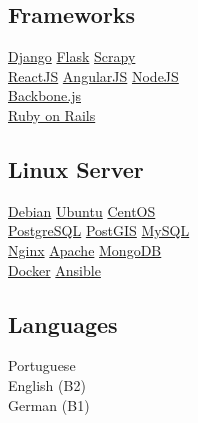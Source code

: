 \documentclass[]{joaosoares-resume}
\begin{document}
\begin{minipage}[t]{0.39\textwidth}
\subsection{Frameworks}
\href{https://www.djangoproject.com/}{Django} \textbullet{}
\href{http://flask.pocoo.org/}{Flask} \textbullet{}
\href{https://scrapy.org/}{Scrapy} \\
\href{https://reactjs.org/}{ReactJS} \textbullet{}
\href{https://angularjs.org}{AngularJS} \textbullet{}
\href{https://nodejs.org/en/}{NodeJS} \\
\href{https://backbonejs.org/}{Backbone.js} \\
\href{https://rubyonrails.org/}{Ruby on Rails} \\
\sectionsep

\subsection{Linux Server}
\href{http://www.debian.org/}{Debian}\textbullet{}
\href{http://www.ubuntu.com/}{Ubuntu}\textbullet{}
\href{http://www.centos.org/}{CentOS}\\
\href{http://www.postgresql.org/}{PostgreSQL}\textbullet{}
\href{http://www.postgis.net}{PostGIS}\textbullet{}
\href{https://www.mysql.com/}{MySQL}\\
\href{https://www.nginx.com/resources/wiki/}{Nginx}\textbullet{}
\href{http://httpd.apache.org/}{Apache} \textbullet{}
\href{https://www.mongodb.com/}{MongoDB} \\
\href{http://www.docker.com/}{Docker} \textbullet{}
\href{https://www.ansible.com/}{Ansible} \\
\sectionsep

\subsection{Languages}
Portuguese \\
English (B2) \\
German (B1)
\sectionsep


\end{minipage}
\end{document}
